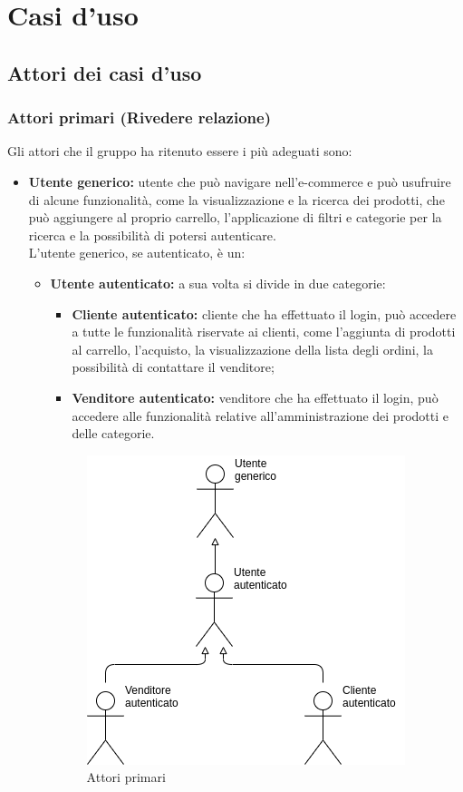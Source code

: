 \section{Casi d'uso}
\subsection{Attori dei casi d'uso}
\subsubsection{Attori primari (\textbf{Rivedere relazione})}
Gli attori che il gruppo ha ritenuto essere i più adeguati sono:
\begin{itemize}
    \item \textbf{Utente generico:} utente che può navigare nell'e-commerce e può usufruire di alcune funzionalità, come la visualizzazione e la ricerca dei prodotti, che può aggiungere al proprio carrello, l'applicazione di filtri e categorie per la ricerca e la possibilità di potersi autenticare.\\ L'utente generico, se autenticato, è un:
          \begin{itemize}
              \item \textbf{Utente autenticato:} a sua volta si divide in due categorie:
                    \begin{itemize}
                        \item \textbf{Cliente autenticato:} cliente che ha effettuato il login, può accedere a tutte le funzionalità riservate ai clienti, come l'aggiunta di prodotti al carrello, l'acquisto, la visualizzazione della lista degli ordini, la possibilità di contattare il venditore;
                        \item \textbf{Venditore autenticato:} venditore che ha effettuato il login, può accedere alle funzionalità relative all'amministrazione dei prodotti e delle categorie.
                    \end{itemize}
                    \begin{figure}[!ht]
                        \caption{Attori primari}
                        \vspace{5px}
                        \includegraphics[scale=0.6]{../../../Images/AnalisiRequisiti/attori}

\end{figure}
\end{itemize}
\end{itemize}
